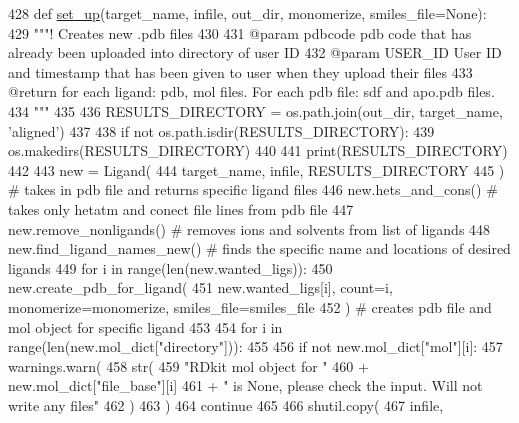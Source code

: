 \begin{DoxyCode}
428 \textcolor{keyword}{def }\hyperlink{namespacefragalysis__api_1_1xcimporter_1_1conversion__pdb__mol_ab8fa8ff14ff0439b99603cbbd33472e2}{set\_up}(target\_name, infile, out\_dir, monomerize, smiles\_file=None):
429     \textcolor{stringliteral}{"""! Creates new .pdb files}
430 \textcolor{stringliteral}{}
431 \textcolor{stringliteral}{    @param pdbcode pdb code that has already been uploaded into directory of user ID}
432 \textcolor{stringliteral}{    @param USER\_ID User ID and timestamp that has been given to user when they upload their files}
433 \textcolor{stringliteral}{    @return for each ligand: pdb, mol files. For each pdb file: sdf and apo.pdb files.}
434 \textcolor{stringliteral}{    """}
435 
436     RESULTS\_DIRECTORY = os.path.join(out\_dir, target\_name, \textcolor{stringliteral}{'aligned'})
437 
438     \textcolor{keywordflow}{if} \textcolor{keywordflow}{not} os.path.isdir(RESULTS\_DIRECTORY):
439         os.makedirs(RESULTS\_DIRECTORY)
440 
441     print(RESULTS\_DIRECTORY)
442 
443     new = Ligand(
444         target\_name, infile, RESULTS\_DIRECTORY
445     )  \textcolor{comment}{# takes in pdb file and returns specific ligand files}
446     new.hets\_and\_cons()  \textcolor{comment}{# takes only hetatm and conect file lines from pdb file}
447     new.remove\_nonligands()  \textcolor{comment}{# removes ions and solvents from list of ligands}
448     new.find\_ligand\_names\_new()  \textcolor{comment}{# finds the specific name and locations of desired ligands}
449     \textcolor{keywordflow}{for} i \textcolor{keywordflow}{in} range(len(new.wanted\_ligs)):
450         new.create\_pdb\_for\_ligand(
451             new.wanted\_ligs[i], count=i, monomerize=monomerize, smiles\_file=smiles\_file
452         )  \textcolor{comment}{# creates pdb file and mol object for specific ligand}
453 
454     \textcolor{keywordflow}{for} i \textcolor{keywordflow}{in} range(len(new.mol\_dict[\textcolor{stringliteral}{"directory"}])):
455 
456         \textcolor{keywordflow}{if} \textcolor{keywordflow}{not} new.mol\_dict[\textcolor{stringliteral}{"mol"}][i]:
457             warnings.warn(
458                 str(
459                     \textcolor{stringliteral}{"RDkit mol object for "}
460                     + new.mol\_dict[\textcolor{stringliteral}{"file\_base"}][i]
461                     + \textcolor{stringliteral}{" is None, please check the input. Will not write any files"}
462                 )
463             )
464             \textcolor{keywordflow}{continue}
465 
466         shutil.copy(
467             infile,

\end{DoxyCode}
